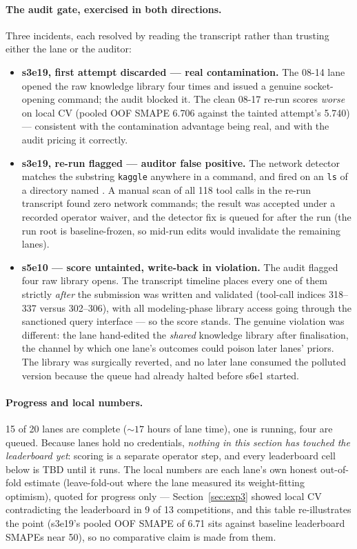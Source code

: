 \documentclass[11pt,a4paper]{article}
\begin{document}
\paragraph{The audit gate, exercised in both directions.} Three incidents, each resolved by reading the transcript rather than trusting either the lane or the auditor:
\begin{itemize}[leftmargin=*]
  \item \textbf{s3e19, first attempt discarded --- real contamination.} The 08-14 lane opened the raw knowledge library four times and issued a genuine socket-opening command; the audit blocked it. The clean 08-17 re-run scores \emph{worse} on local CV (pooled OOF SMAPE 6.706 against the tainted attempt's 5.740) --- consistent with the contamination advantage being real, and with the audit pricing it correctly.
  \item \textbf{s3e19, re-run flagged --- auditor false positive.} The network detector matches the substring \texttt{kaggle} anywhere in a command, and fired on an \texttt{ls} of a directory named . A manual scan of all 118 tool calls in the re-run transcript found zero network commands; the result was accepted under a recorded operator waiver, and the detector fix is queued for after the run (the run root is baseline-frozen, so mid-run edits would invalidate the remaining lanes).
  \item \textbf{s5e10 --- score untainted, write-back in violation.} The audit flagged four raw library opens. The transcript timeline places every one of them strictly \emph{after} the submission was written and validated (tool-call indices 318--337 versus 302--306), with all modeling-phase library access going through the sanctioned query interface --- so the score stands. The genuine violation was different: the lane hand-edited the \emph{shared} knowledge library after finalisation, the channel by which one lane's outcomes could poison later lanes' priors. The library was surgically reverted, and no later lane consumed the polluted version because the queue had already halted before s6e1 started.
\end{itemize}

\paragraph{Progress and local numbers.} 15 of 20 lanes are complete (${\sim}17$ hours of lane time), one is running, four are queued. Because lanes hold no credentials, \emph{nothing in this section has touched the leaderboard yet}: scoring is a separate operator step, and every leaderboard cell below is TBD until it runs. The local numbers are each lane's own honest out-of-fold estimate (leave-fold-out where the lane measured its weight-fitting optimism), quoted for progress only --- Section~\ref{sec:exp3} showed local CV contradicting the leaderboard in 9 of 13 competitions, and this table re-illustrates the point (s3e19's pooled OOF SMAPE of 6.71 sits against baseline leaderboard SMAPEs near 50), so no comparative claim is made from them.
\end{document}
